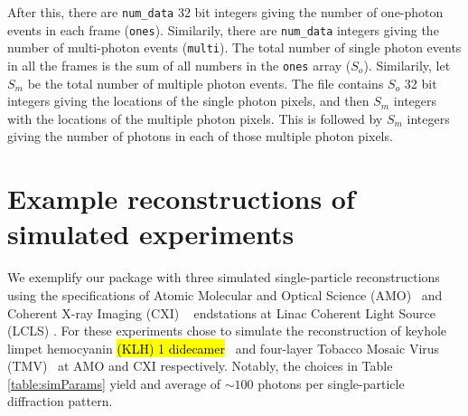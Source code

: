 \documentclass[]{iucr}              %
\begin{document}
After this, there are \texttt{num\_data} 32 bit integers giving the number of one-photon events in each frame (\texttt{ones}). Similarily, there are \texttt{num\_data} integers giving the number of multi-photon events (\texttt{multi}). The total number of single photon events in all the frames is the sum of all numbers in the \texttt{ones} array ($S_o$). Similarily, let $S_m$ be the total number of multiple photon events. The file contains $S_o$ 32 bit integers giving the locations of the single photon pixels, and then $S_m$ integers with the locations of the multiple photon pixels. This is followed by $S_m$ integers giving the number of photons in each of those multiple photon pixels. 

\section{Example reconstructions of simulated experiments}\label{sec:simulations}

We exemplify our package with three simulated single-particle reconstructions using the specifications of Atomic Molecular and Optical Science (AMO)~\cite{ferguson2015} and Coherent X-ray Imaging (CXI) ~\cite{liang2015} endstations at Linac Coherent Light Source (LCLS) \cite{Emma2010}. For these experiments chose to simulate the reconstruction of keyhole limpet hemocyanin \hl{(KLH) 1 didecamer}~\cite{gatsogiannis2009} and four-layer Tobacco Mosaic Virus (TMV)~\cite{bhyravbhatla1998} at AMO and CXI respectively. Notably, the choices in Table \ref{table:simParams} yield and average of $\sim 100$ photons per single-particle diffraction pattern.
\end{document}
